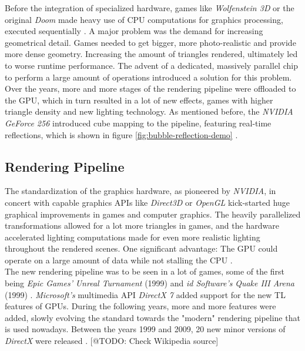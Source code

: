 \noindent
Before the integration of specialized hardware, games like \emph{Wolfenstein 3D} or the 
original \emph{Doom} made heavy use of \ac{CPU} computations for graphics processing, 
executed sequentially \cite{NVIDIA1999}. A major problem was the demand for increasing 
geometrical detail. Games needed to get bigger, more photo-realistic and provide more dense 
geometry. Increasing the amount of triangles rendered, ultimately led to worse runtime 
performance. The advent of a dedicated, massively parallel chip to perform a large amount of 
operations introduced a solution for this problem. Over the years, more and more stages of the 
rendering pipeline were offloaded to the \ac{GPU}, which in turn resulted in a lot of new effects, 
games with higher triangle density and new lighting technology. As mentioned before, the \emph{NVIDIA 
GeForce 256} introduced cube mapping to the pipeline, featuring real-time reflections, which is 
shown in figure \ref{fig:bubble-reflection-demo} \cite{Battaglia2024}.


\subsection*{Rendering Pipeline} \label{subsec-rendering-pipeline}

The standardization of the graphics hardware, as pioneered by \emph{NVIDIA}, in concert with capable 
graphics \ac{API}s like \emph{Direct3D} or \emph{OpenGL} kick-started huge graphical improvements in 
games and computer graphics. The heavily parallelized transformations allowed for a lot more triangles 
in games, and the hardware accelerated lighting computations made for even more realistic lighting 
throughout the rendered scenes. One significant advantage: The \ac{GPU} could operate on a large amount 
of data while not stalling the \ac{CPU} \cite{Fenno2024}.\\

\noindent
The new rendering pipeline was to be seen in a lot of games, some of the first being \emph{Epic Games'} 
\emph{Unreal Turnament} (1999) and \emph{id Software's} \emph{Quake III Arena} (1999) \cite{UnrealTurnament, 
Quake3Arena}. \emph{Microsoft's} multimedia \ac{API} \emph{DirectX 7} added support for the new \ac{TL} 
features of \ac{GPU}s. During the following years, more and more features were added, slowly evolving the 
standard towards the "modern" rendering pipeline that is used nowadays. Between the years 1999 and 2009,
20 new minor versions of \emph{DirectX} were released \cite{WikiDirectX}. [@TODO: Check Wikipedia source] 


